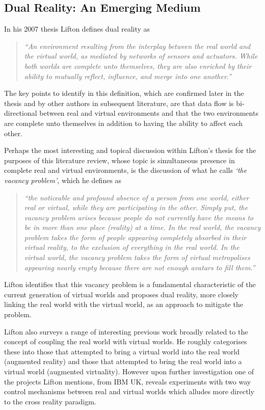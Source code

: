 \subsection{Dual Reality: An Emerging Medium}
\label{subsec:dual_reality_:_an_emerging_medium}
In his 2007 thesis Lifton defines dual reality as
\begin{quote}
\textit{``An environment resulting from the interplay between the real world and the virtual world, as mediated by networks of sensors and actuators. While both worlds are complete unto themselves, they are also enriched by their ability to mutually reflect, influence, and merge into one another.''}~\cite{Lifton2007a}
\end{quote}
The key points to identify in this definition, which are confirmed later in the thesis and by other authors in subsequent literature, are that data flow is bi-directional between real and virtual environments and that the two environments are complete unto themselves in addition to having the ability to affect each other.

Perhaps the most interesting and topical discussion within Lifton's thesis for the purposes of this literature review, whose topic is simultaneous presence in complete real and virtual environments, is the discussion of what he calls \textit{`the vacancy problem'}, which he defines as
\begin{quote}
\textit{``the noticeable and profound absence of a person from one world, either real or virtual, while they are participating in the other. Simply put, the vacancy problem arises because people do not currently have the means to be in more than one place (reality) at a time. In the real world, the vacancy problem takes the form of people appearing completely absorbed in their virtual reality, to the exclusion of everything in the real world. In the virtual world, the vacancy problem takes the form of virtual metropolises appearing nearly empty because there are not enough avatars to fill them.''}
\end{quote}
Lifton identifies that this vacancy problem is a fundamental characteristic of the current generation of virtual worlds and proposes dual reality, more closely linking the real world with the virtual world, as an approach to mitigate the problem.

Lifton also surveys a range of interesting previous work broadly related to the concept of coupling the real world with virtual worlds. He roughly categorises these into those that attempted to bring a virtual world into the real world (augmented reality) and those that attempted to bring the real world into a virtual world (augmented virtuality). However upon further investigation one of the projects Lifton mentions, from IBM UK, reveals experiments with two way control mechanisms between real and virtual worlds which alludes more directly to the cross reality paradigm.

